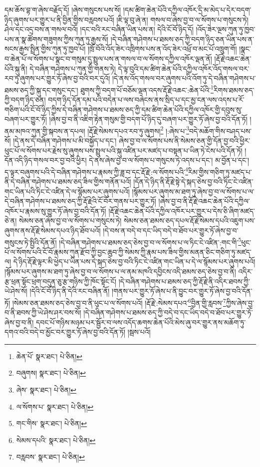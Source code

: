 དམ་ཆོས་བྷ་ག་ཞེས་བརྗོད་དོ། །ཞེས་གསུངས་པས་སོ། །དམ་ཚིག་ཆེན་པོའི་དཀྱིལ་འཁོར་དྲི་མ་མེད་པ་དེར་བདག་ཉིད་ཞུགས་པར་གྱུར་པ་ནི་བྱིན་གྱིས་བརླབས་པའོ། །ཇི་ལྟ་བུ་ཞེ་ན། གསལ་བ་ཞེས་བྱ་བ་ལ་སོགས་པ་གསུངས་ཏེ། ཤེལ་དང་འདྲ་བས་ན་གསལ་བའོ། །དང་བའི་རང་བཞིན་ཡིན་པས་ན། དེའི་ངོ་བོ་ཉིད་དོ། །འོད་ཟེར་ལྔས་ཀུན་ཏུ་ཁྱབ་པས་ན་སྣ་ཚོགས་གཟུགས་ཀྱིས་ཀུན་ཏུ་རྒྱས་སོ། །དེ་བཞིན་གཤེགས་པ་ཐམས་ཅད་ཀྱི་བདག་ཉིད་ཅན་ཡིན་པས་ན་སངས་རྒྱས་སྤྲིན་གྱིས་ཀུན་ཏུ་ཁྱབ་པོ། །ཁྲོ་བོའི་འོད་ཟེར་འཁྲིགས་པས་ན་འོད་ཟེར་འཕྲོ་བ་མང་པོ་འཁྲུག་གོ། །སྣང་བ་ཆེན་པོ་ལ་སོགས་པ་སྣང་བ་གསུམ་དུ་སྤྲུལ་པས་ན་གསལ་བ་ལ་སོགས་དཀྱིལ་འཁོར་ལྡན་ནོ། །རྡོ་རྗེ་འཆང་ཆེན་པོའི་སྐུ་ནི། དེ་བཞིན་གཤེགས་པ་ཀུན་གྱི་གནས་ཏེ། དེ་ལྟ་བུའི་དམ་ཚིག་ཆེན་པོའི་དཀྱིལ་འཁོར་འོད་གསལ་བར་རབ་ཏུ་ཞུགས་པར་གྱུར་ཏོ་ཞེས་བྱ་བའི་བར་དུའོ། །དེ་ནས་འོད་གསལ་བར་ཞུགས་པའི་འོག་ཏུ་དེ་བཞིན་གཤེགས་པ་ཐམས་ཅད་ཀྱི་སྐུ་དང་གསུང་དང་། ཐུགས་ཀྱི་བདག་པོ་བཅོམ་ལྡན་འདས་རྡོ་རྗེ་འཆང་:ཆེན་པོའི་\footnote{ཆེན་པོ་  སྣར་ཐང་།  པེ་ཅིན། }རིགས་ཐམས་ཅད་ཀྱི་བདག་ཉིད་ཅན། བདག་ཉིད་དོན་དམ་པའི་བདེན་པ་ལས་བཞེངས་ནས་སྲིད་པ་དང་མྱ་ངན་ལས་འདས་པ་རོ་གཅིག་པའི་ངོ་བོ་ཉིད་ཀྱིས་དེ་བཞིན་གཤེགས་པ་ཐམས་ཅད་ཀྱི་དམ་ཚིག་ཆེན་པོའི་དཀྱིལ་འཁོར་གྱི་དབུས་སུ་བཞག་པར་གྱུར་ཏོ། །ཞེས་བྱ་བ་ནི་འཇིག་རྟེན་གསུམ་གྱི་བདག་པོ་ཉིད་དུ་བཞག་པར་གྱུར་ཏོ་ཞེས་བྱ་བའི་དོན་ཏོ། །ནམ་མཁའ་ཀུན་གྱི་སྐབས་ན་དཔལ། །རྡོ་རྗེ་སེམས་དཔའ་རབ་ཏུ་ཞུགས།\footnote{བཞུགས།  སྣར་ཐང་།  པེ་ཅིན། } །:ཞེས་པ་\footnote{ཞེས་  སྣར་ཐང་།  པེ་ཅིན། }བདེ་མཆོག་གིས་བཤད་པས་སོ། །དེ་ནས་དེ་བཞིན་གཤེགས་པ་མི་བསྐྱོད་པ་དང་། ཞེས་བྱ་བ་ལ་སོགས་པས་ནི་སེམས་ཅན་གྱི་དོན་བྱ་བའི་ཕྱིར་ཕུང་པོ་ལ་སོགས་པར་རྗེས་སུ་ཞུགས་པས་སྤྲུལ་པའི་སྐུ་འཛིན་པར་མཛད་པ་བསྟན་པ་ཡིན་ཏེ་ངེས་པའི་དོན་ཏོ། །དོན་འདི་ཉིད་གསལ་བར་བྱ་བའི་ཕྱིར། དེ་ནས་ཞེས་བྱ་བ་ལ་སོགས་པ་གསུངས་ཏེ་འདས་པ་དང་། མ་བྱོན་པ་དང་། ད་ལྟར་བཞུགས་པའི་དེ་བཞིན་གཤེགས་པ་རྣམས་ཀྱི་ཟླ་བ་དང་རྡོ་རྗེ་:ལ་སོགས་པའི་\footnote{ལ་སོགས་པ་  སྣར་ཐང་།  པེ་ཅིན། }རིམ་གྱིས་གཅིག་ཏུ་མཛད་པ་ནི་དེ་བཞིན་གཤེགས་པ་ཐམས་ཅད་ཟིལ་གྱིས་གནོན་པའོ། །དོན་དེ་ཉིད་ནི་རྡོ་རྗེ་སྟེ་དེ་སྐད་ཅེས་བྱ་བའི་ཏིང་ངེ་འཛིན་གང་ཡིན་པའི་ཏིང་ངེ་འཛིན་དེ་ལ་སྙོམས་པར་ཞུགས་པའོ། །སྙོམས་པར་ཞུགས་མ་ཐག་ཏུ་ཞེས་བྱ་བ་ལ་སོགས་པ་ལ་དེ་བཞིན་གཤེགས་པ་ཐམས་ཅད་ཀྱི་རྡོ་རྗེའི་ངོ་བོར་གནས་པར་གྱུར་ཏོ། །ཞེས་བྱ་བ་ནི་རྡོ་རྗེ་འཆང་ཆེན་པོའི་དཀྱིལ་འཁོར་པ་རྣམས་སུ་གྱུར་ཏོ་ཞེས་བྱ་བའི་དོན་ཏོ། །རྡོ་རྗེ་འཆང་ཆེན་པོའི་དཀྱིལ་འཁོར་པར་གྱུར་པ་དེས་ཅི་ཞིག་མཛད་ཅེ་ན། སེམས་ཅན་ཞེས་བྱ་བ་ལ་སོགས་པ་གསུངས་ཏེ། སེམས་ཅན་ཐམས་ཅད་དཔལ་རྡོ་རྗེ་སེམས་དཔའི་འཇུག་པས་ཞུགས་ནས་རྡོ་རྗེ་སེམས་དཔའ་ཉིད་ཐོབ་པའོ། །དེ་བས་ན་བདེ་བ་དང་ཡིད་བདེ་བ་ཐོབ་པར་གྱུར་ཏོ་ཞེས་བྱ་བ་གསུངས་ཏེ་སྤྱིའི་དོན་ནོ། །དེ་བཞིན་གཤེགས་པ་ཐམས་ཅད་ཅེས་བྱ་བ་ལ་སོགས་པ་ལ་ཏིང་ངེ་འཛིན་:གང་གི་\footnote{གང་གིས་  སྣར་ཐང་།  པེ་ཅིན། }ཕུང་པོ་ལ་སོགས་པའི་ངོ་བོ་རྣམས་ཀུན་རྫོབ་ཀྱི་བྱང་ཆུབ་ཀྱི་སེམས་ཀྱི་རྣམ་པས་ཟིལ་གྱིས་མནན་ཅིང་གཅིག་ཏུ་མཛད་ལ། དེ་ཉིད་རྡོ་རྗེ་ལྟར་མི་ཕྱེད་པ་ཡིན་པས་དེ་སྐད་ཅེས་བྱ་བའི་ཏིང་ངེ་འཛིན་གང་ཡིན་པ་དེ་ལ་སྙོམས་པར་ཞུགས་པའོ། །སྙོམས་པར་ཞུགས་མ་ཐག་ཏུ་ཞེས་བྱ་བ་ལ་སོགས་པ་ལ་ནམ་མཁའི་དབྱིངས་འདི་ཐམས་ཅད་ཅེས་བྱ་བ་ནི། འདིར་རྩ་ཕྲན་སྟོང་ཕྲག་བདུན་ཅུ་རྩ་གཉིས་ཀྱི་ཁོང་སྟོང་ངོ། །དེ་བཞིན་གཤེགས་པ་ཐམས་ཅད་ཀྱི་རྡོ་རྗེ་ནི་འདིར་ཐབས་ཀྱི་ཡེ་ཤེས་སོ། །དེའི་ངོ་བོ་ཉིད་ནི་དེའི་རང་བཞིན་ནོ། །གནས་པར་གྱུར་ཏོ་ཞེས་པ་ནི་བྱུང་བར་གྱུར་ཏོ་ཞེས་བྱ་བའི་དོན་ཏོ། །སེམས་ཅན་ཐམས་ཅད་ཅེས་བྱ་བ་ནི་ཕུང་པ་ལ་སོགས་པའོ། །རྡོ་རྗེ་:སེམས་དཔའ་\footnote{སེམས་དཔའི་  སྣར་ཐང་།  པེ་ཅིན། }བྱིན་གྱི་རླབས་\footnote{བརླབས་  སྣར་ཐང་།  པེ་ཅིན། }ཀྱིས་ཞེས་བྱ་བ་ནི་ཐབས་ཀྱི་ཡེ་ཤེས་ཤར་བས་སོ། །དེ་བཞིན་གཤེགས་པ་ཐམས་ཅད་ཀྱི་བདེ་བ་དང་ཡིད་བདེ་བ་ཐོབ་པར་གྱུར་ཏོ་ཞེས་བྱ་བ་ནི། དབང་པོ་གཉིས་མཉམ་པར་སྦྱོར་བ་ལས་འདོད་ཆགས་ཆེན་པོའི་མེས་ཞུ་བར་གྱུར་ནས་མཆོག་ཏུ་དགའ་བའི་བདེ་བ་མྱོང་བར་གྱུར་ཏོ་ཞེས་བྱ་བའི་དོན་ཏོ། །སྦས་པའོ། 